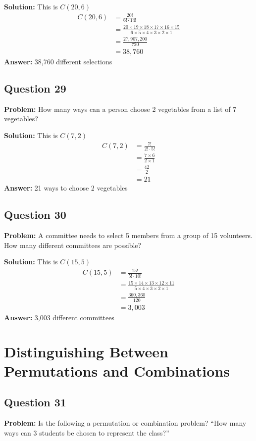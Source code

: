 \documentclass[12pt]{article}
\begin{document}
\textbf{Solution:} This is $C(20,6)$
\begin{align*}
C(20,6) &= \frac{20!}{6! \cdot 14!} \\
&= \frac{20 \times 19 \times 18 \times 17 \times 16 \times 15}{6 \times 5 \times 4 \times 3 \times 2 \times 1} \\
&= \frac{27{,}907{,}200}{720} \\
&= 38{,}760
\end{align*}
\textbf{Answer:} 38,760 different selections

\subsection*{Question 29}
\textbf{Problem:} How many ways can a person choose 2 vegetables from a list of 7 vegetables?

\textbf{Solution:} This is $C(7,2)$
\begin{align*}
C(7,2) &= \frac{7!}{2! \cdot 5!} \\
&= \frac{7 \times 6}{2 \times 1} \\
&= \frac{42}{2} \\
&= 21
\end{align*}
\textbf{Answer:} 21 ways to choose 2 vegetables

\subsection*{Question 30}
\textbf{Problem:} A committee needs to select 5 members from a group of 15 volunteers. How many different committees are possible?

\textbf{Solution:} This is $C(15,5)$
\begin{align*}
C(15,5) &= \frac{15!}{5! \cdot 10!} \\
&= \frac{15 \times 14 \times 13 \times 12 \times 11}{5 \times 4 \times 3 \times 2 \times 1} \\
&= \frac{360{,}360}{120} \\
&= 3{,}003
\end{align*}
\textbf{Answer:} 3,003 different committees

\section{Distinguishing Between Permutations and Combinations}

\subsection*{Question 31}
\textbf{Problem:} Is the following a permutation or combination problem? ``How many ways can 3 students be chosen to represent the class?''
\end{document}
